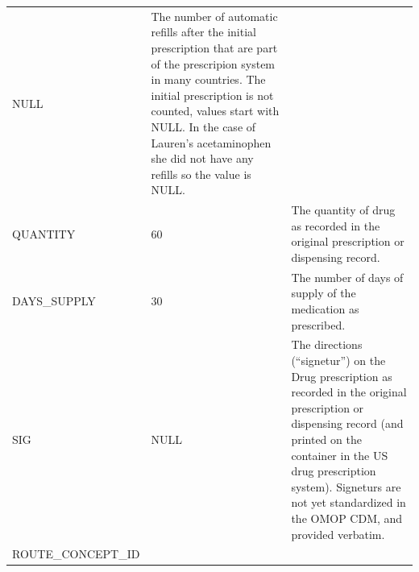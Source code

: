 \documentclass[11pt]{book}
\theoremstyle{definition}
\theoremstyle{definition}
\theoremstyle{definition}
\theoremstyle{remark}
\begin{document}
\begin{longtable}[]{@{}lll@{}}
\begin{minipage}[t]{0.15\columnwidth}
NULL\strut
\end{minipage} & \begin{minipage}[t]{0.49\columnwidth}\raggedright
The number of automatic refills after the initial prescription that are part of the prescripion system in many countries. The initial prescription is not counted, values start with NULL. In the case of Lauren's acetaminophen she did not have any refills so the value is NULL.\strut
\end{minipage}\tabularnewline
\begin{minipage}[t]{0.28\columnwidth}\raggedright
QUANTITY\strut
\end{minipage} & \begin{minipage}[t]{0.15\columnwidth}\raggedright
60\strut
\end{minipage} & \begin{minipage}[t]{0.49\columnwidth}\raggedright
The quantity of drug as recorded in the original prescription or dispensing record.\strut
\end{minipage}\tabularnewline
\begin{minipage}[t]{0.28\columnwidth}\raggedright
DAYS\_SUPPLY\strut
\end{minipage} & \begin{minipage}[t]{0.15\columnwidth}\raggedright
30\strut
\end{minipage} & \begin{minipage}[t]{0.49\columnwidth}\raggedright
The number of days of supply of the medication as prescribed.\strut
\end{minipage}\tabularnewline
\begin{minipage}[t]{0.28\columnwidth}\raggedright
SIG\strut
\end{minipage} & \begin{minipage}[t]{0.15\columnwidth}\raggedright
NULL\strut
\end{minipage} & \begin{minipage}[t]{0.49\columnwidth}\raggedright
The directions (``signetur'') on the Drug prescription as recorded in the original prescription or dispensing record (and printed on the container in the US drug prescription system). Signeturs are not yet standardized in the OMOP CDM, and provided verbatim.\strut
\end{minipage}\tabularnewline
\begin{minipage}[t]{0.28\columnwidth}\raggedright
ROUTE\_CONCEPT\_ID\strut
\end{minipage} & \begin{minipage}[t]{0.15\columnwidth}\raggedright

\end{minipage}
\end{longtable}
\end{document}
